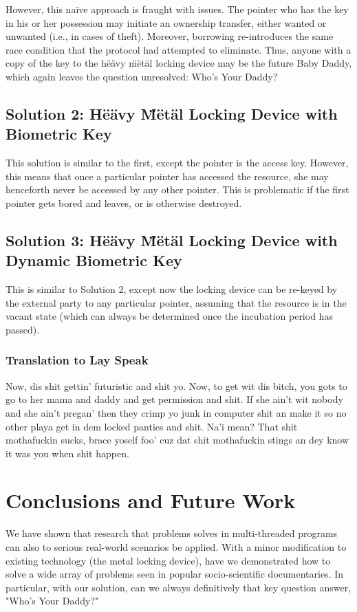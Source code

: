 \documentclass[10pt,twocolumn,letterpaper]{article}
\begin{document}
However, this na\"{i}ve approach is fraught with issues. The pointer who has the key in his or her possession may initiate an ownership transfer, either wanted or unwanted (i.e., in cases of theft). Moreover, borrowing re-introduces the same race condition that the protocol had attempted to eliminate. Thus, anyone with a copy of the key to the h\"{e}\"{a}vy \"{m}\"{e}t\"{a}l locking device may be the future Baby Daddy, which again leaves the question unresolved: Who's Your Daddy?

\subsection{Solution 2: H\"{e}\"{a}vy \"{M}\"{e}t\"{a}l Locking Device with Biometric Key}
This solution is similar to the first, except the pointer is the access key. However, this means that once a particular pointer has accessed the resource, she may henceforth never be accessed by any other pointer. This is problematic if the first pointer gets bored and leaves, or is otherwise destroyed.

\subsection{Solution 3: H\"{e}\"{a}vy \"{M}\"{e}t\"{a}l Locking Device with Dynamic Biometric Key}
This is similar to Solution 2, except now the locking device can be re-keyed by the external party to any particular pointer, assuming that the resource is in the vacant state (which can always be determined once the incubation period has passed).

\subsubsection{Translation to Lay Speak}
Now, dis shit gettin' futuristic and shit yo. Now, to get wit dis bitch, you gots to go to her mama and daddy and get permission and shit. If she ain't wit nobody and she ain't pregan' then they crimp yo junk in computer shit an make it so no other playa get in dem locked panties and shit. Na'i mean? That shit mothafuckin sucks, brace yoself foo' cuz dat shit mothafuckin stings an dey know it was you when shit happen.

\section{Conclusions and Future Work}
We have shown that research that problems solves in multi-threaded programs can also to serious real-world scenarios be applied. With a minor modification to existing technology (the metal locking device), have we demonstrated how to solve a wide array of problems seen in popular socio-scientific documentaries. In particular, with our solution, can we always definitively that key question answer, "Who's Your Daddy?"
\end{document}

